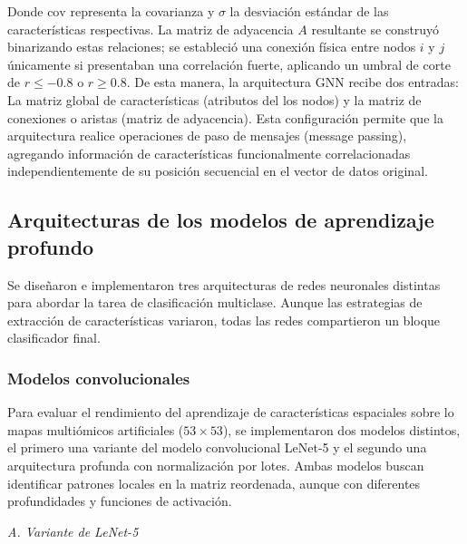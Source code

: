 \documentclass[review,12pt,times,number]{elsarticle}
\begin{document}
Donde $\text{cov}$ representa la covarianza y $\sigma$ la desviación estándar de las características respectivas. La matriz de adyacencia $A$ resultante se construyó binarizando estas relaciones; se estableció una conexión física entre nodos $i$ y $j$ únicamente si presentaban una correlación fuerte, aplicando un umbral de corte de $r \le -0.8$ o $r \ge 0.8$. De esta manera, la arquitectura GNN recibe dos entradas: La matriz global de características (atributos del los nodos) y la matriz de conexiones o aristas (matriz de adyacencia). Esta configuración permite que la arquitectura realice operaciones de paso de mensajes (message passing), agregando información de características funcionalmente correlacionadas independientemente de su posición secuencial en el vector de datos original.



\subsection{Arquitecturas de los modelos de aprendizaje profundo}

Se diseñaron e implementaron tres arquitecturas de redes neuronales distintas para abordar la tarea de clasificación multiclase. Aunque las estrategias de extracción de características variaron, todas las redes compartieron un bloque clasificador final.


\subsubsection{Modelos convolucionales}

Para evaluar el rendimiento del aprendizaje de características espaciales sobre lo mapas multiómicos artificiales ($53 \times 53$), se implementaron dos modelos distintos, el primero una variante del modelo convolucional LeNet-5 y el segundo una arquitectura profunda con normalización por lotes. Ambas modelos buscan identificar patrones locales en la matriz reordenada, aunque con diferentes profundidades y funciones de activación.

\textit{A. Variante de LeNet-5}
\end{document}
